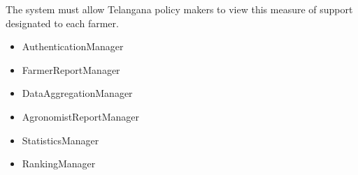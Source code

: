 \begin{itemize}
\begin{itemize}
\end{itemize}
 The system must allow Telangana policy makers to view this measure of support designated to each farmer.
\begin{itemize}

\item AuthenticationManager
\item FarmerReportManager
\item DataAggregationManager
\item AgronomistReportManager
\item StatisticsManager
\item RankingManager

\end{itemize}
\end{itemize}